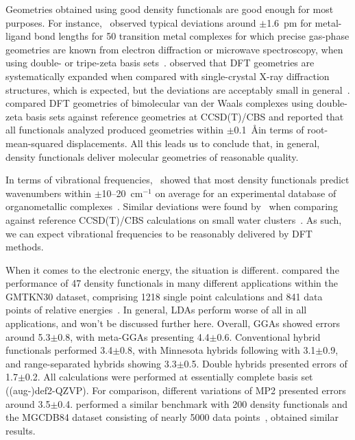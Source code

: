 Geometries obtained using good density functionals are good enough
for most purposes.
For instance,~\citeauthor{Bühl_2006} observed typical deviations around $\pm$1.6~pm for
metal-ligand bond lengths for 50 transition metal complexes for which precise gas-phase geometries
are known from electron diffraction or microwave spectroscopy,
when using double- or tripe-zeta basis sets~\cite{Bühl_2006}.
\citeauthor{Minenkov_2012} observed that
DFT geometries are systematically expanded when compared with single-crystal
X-ray diffraction structures,
which is expected,
but the deviations are
acceptably small in general~\cite{Minenkov_2012}.
\citeauthor{Sirianni_2018} compared DFT geometries of bimolecular van der Waals complexes using
double-zeta basis sets against reference geometries at CCSD(T)/CBS
and reported that all functionals analyzed produced
geometries within $\pm$0.1~\AA in terms
of root-mean-squared displacements.
All this leads us to conclude that,
in general,
density functionals deliver molecular geometries of reasonable quality.

In terms of vibrational frequencies,~\citeauthor{Katari_2017} showed that most density functionals
predict wavenumbers within $\pm$10--20~cm$^{-1}$ on average for
an experimental database of organometallic complexes~\cite{Katari_2017}.
Similar deviations were found by~\citeauthor{Howard_2015}
when comparing against reference CCSD(T)/CBS calculations on
small water clusters~\cite{Howard_2015}.
As such,
we can expect vibrational frequencies to be reasonably delivered
by DFT methods.

When it comes to the electronic energy,
the situation is different.
\citeauthor{Goerigk_2011} compared the performance of 47 density functionals
in many different applications
within the GMTKN30 dataset,
comprising 1218 single point calculations
and 841 data points of relative energies~\cite{Goerigk_2011}.
In general,
LDAs perform worse of all in all applications,
and won't be discussed further here.
Overall,
GGAs showed errors around 5.3$\pm$0.8\kcalmol,
with meta-GGAs presenting 4.4$\pm$0.6\kcalmol.
Conventional hybrid functionals performed 3.4$\pm$0.8\kcalmol,
with Minnesota hybrids following with 3.1$\pm$0.9\kcalmol,
and range-separated hybrids showing 3.3$\pm$0.5\kcalmol.
Double hybrids presented errors of 1.7$\pm$0.2\kcalmol.
All calculations were performed at essentially complete basis set
((aug-)def2-QZVP).
For comparison,
different variations of MP2
presented errors around 3.5$\pm$0.4\kcalmol.
\citeauthor{Mardirossian_2017} performed a similar
benchmark with 200 density functionals and the MGCDB84 dataset
consisting of nearly 5000 data points~\cite{Mardirossian_2017},
obtained similar results.

